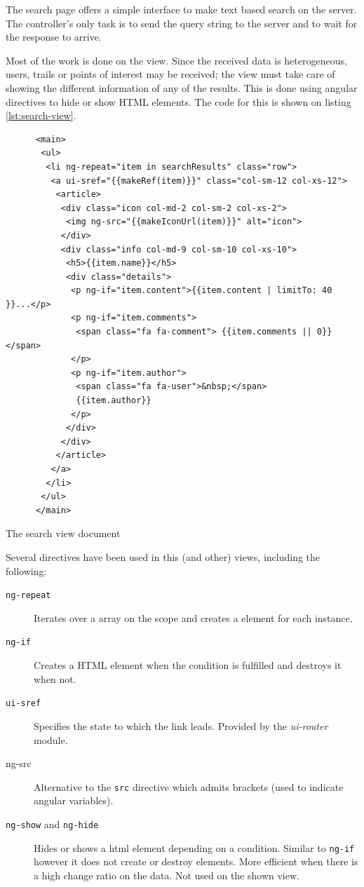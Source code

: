 The search page offers a simple interface to make text based search on the server. The controller's only task is to send the query string to the server and to wait for the response to arrive.

Most of the work is done on the view. Since the received data is heterogeneous, users, trails or points of interest may be received; the view must take care of showing the different information of any of the results. This is done using angular directives to hide or show HTML elements. The code for this is shown on listing \ref{lst:search-view}.

\begin{listing}[ht]\centering
  \begin{minipage}{.85\textwidth}
    \begin{verbatim}
      <main>
       <ul>
        <li ng-repeat="item in searchResults" class="row">
         <a ui-sref="{{makeRef(item)}}" class="col-sm-12 col-xs-12">
          <article>
           <div class="icon col-md-2 col-sm-2 col-xs-2">
            <img ng-src="{{makeIconUrl(item)}}" alt="icon">
           </div>
           <div class="info col-md-9 col-sm-10 col-xs-10">
            <h5>{{item.name}}</h5>
            <div class="details">
             <p ng-if="item.content">{{item.content | limitTo: 40 }}...</p>
             <p ng-if="item.comments">
              <span class="fa fa-comment"> {{item.comments || 0}} </span>
             </p>
             <p ng-if="item.author">
              <span class="fa fa-user">&nbsp;</span> 
              {{item.author}} 
             </p>
            </div>
           </div>
          </article>
         </a>
        </li>
       </ul>
      </main>
    \end{verbatim}
  \end{minipage}
  \caption{The search view document}\label{lst:search-view}
\end{listing}

Several directives have been used in this (and other) views, including the following:

\begin{description}
\item[\texttt{ng-repeat}] Iterates over a array on the scope and creates a element for each instance.
\item[\texttt{ng-if}] Creates a HTML element when the condition is fulfilled and destroys it when not.
\item[\texttt{ui-sref}] Specifies the state to which the link leads. Provided by the \textit{ui-router} module.
\item[ng-src] Alternative to the \texttt{src} directive which admits brackets (used to indicate angular variables).
\item[\texttt{ng-show} and \texttt{ng-hide}] Hides or shows a html element depending on a condition. Similar to \texttt{ng-if} however it does not create or destroy elements. More efficient when there is a high change ratio on the data. Not used on the shown view.
\end{description}

